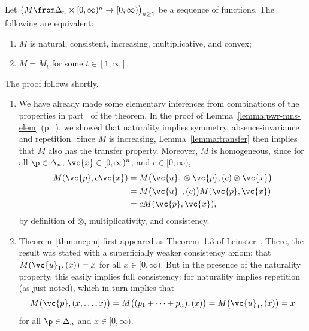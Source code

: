 \begin{thm}
%
%
\index{power mean!characterization of!weighted on $[0, \infty)$}%
%
Let $\bigl( M \from \Delta_n \times [0, \infty)^n \to [0, \infty) \bigr)_{n
\geq 1}$ be a sequence of functions.  The following are equivalent:
% 
\begin{enumerate}
\item 
{}
$M$ is natural, consistent, increasing, multiplicative, and convex;

\item
{}
$M = M_t$ for some $t \in [1, \infty]$.
\end{enumerate}
\end{thm}

The proof follows shortly.

\begin{remarks}
\begin{enumerate}
\item 
{} 
We have already made some elementary inferences from combinations of the
properties in part~ of the theorem.  In the proof of
Lemma~\ref{lemma:pwr-mns-elem} (p.~\pageref{p:lpme-pf}), we showed that
naturality implies symmetry, absence-invariance and repetition.  Since $M$
is increasing, Lemma~\ref{lemma:transfer} then implies that $M$ also has
the transfer property.  Moreover, $M$ is homogeneous, since for all $\p \in
\Delta_n$, $\vc{x} \in [0, \infty)^n$, and $c \in [0, \infty)$,
% 
\begin{align*}
M(\vc{p}, c\vc{x})      &
=
M\bigl(\vc{u}_1 \otimes \vc{p}, (c) \otimes \vc{x}\bigr)        \\
&
=
M\bigl( \vc{u}_1, (c) \bigr) M(\vc{p}, \vc{x})  \\
&
=
c M(\vc{p}, \vc{x}), 
\end{align*}
% 
by definition of $\otimes$, multiplicativity, and consistency.

\item
{}
Theorem~\ref{thm:mcpm} first appeared as Theorem~1.3 of
Leinster~\cite{MCPM}.  There, the result was stated with a superficially
weaker consistency axiom: that $M(\vc{u}_1, (x)) = x$ for all $x \in [0,
\infty)$.  But in the presence of the naturality property, this easily
implies full consistency: for naturality implies repetition (as just
noted), which in turn implies that
\[
M\bigl(\vc{p}, (x, \ldots, x)\bigr)
=
M\bigl((p_1 + \cdots + p_n), (x)\bigr)
=
M\bigl(\vc{u}_1, (x)\bigr)
=
x
\]
for all $\p \in \Delta_n$ and $x \in [0, \infty)$. 
\end{enumerate}
\end{remarks}

